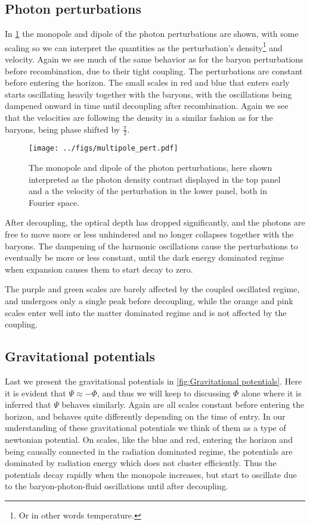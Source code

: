 \documentclass[10pt,a4paper]{article}
\begin{document}
\subsection{Photon perturbations}
\label{subsec:Results/Photon pert}
In \cref{fig:Photon pert} the monopole and dipole of the photon perturbations are shown, with some scaling so we can interpret the quantities as the perturbation's density\footnote{Or in other words temperature.} and velocity. Again we see much of the same behavior as for the baryon perturbations before recombination, due to their tight coupling. The perturbations are constant before entering the horizon. The small scales in red and blue that enters early starts oscillating heavily together with the baryons, with the oscillations being dampened onward in time until decoupling after recombination. Again we see that the velocities are following the density in a similar fashion as for the baryons, being phase shifted by $\frac{\pi}{2}$.

\begin{figure}[ht!]
\centering
\texttt{[image: ../figs/multipole\_pert.pdf]}
\caption{The monopole and dipole of the photon perturbations, here shown interpreted as the photon density contrast displayed in the top panel and a the velocity of the perturbation in the lower panel, both in Fourier space.}
\label{fig:Photon pert}
\end{figure}

After decoupling, the optical depth has dropped significantly, and the photons are free to move more or less unhindered and no longer collapses together with the baryons. The dampening of the harmonic oscillations cause the perturbations to eventually be more or less constant, until the dark energy dominated regime when expansion causes them to start decay to zero.

The purple and green scales are barely affected by the coupled oscillated regime, and undergoes only a single peak before decoupling, while the orange and pink scales enter well into the matter dominated regime and is not affected by the coupling.

\subsection{Gravitational potentials}
\label{subsec:Results/Grav potentials}
Last we present the gravitational potentials in \cref{fig:Gravitational potentials}. Here it is evident that $\Psi \approx -\Phi$, and thus we will keep to discussing $\Phi$ alone where it is inferred that $\Psi$ behaves similarly. Again are all scales constant before entering the horizon, and behaves quite differently depending on the time of entry. In our understanding of these gravitational potentials we think of them as a type of newtonian potential. On scales, like the blue and red, entering the horizon and being causally connected in the radiation dominated regime, the potentials are dominated by radiation energy which does not cluster efficiently. Thus the potentials decay rapidly when the monopole increases, but start to oscillate due to the baryon-photon-fluid oscillations until after decoupling.
\end{document}
